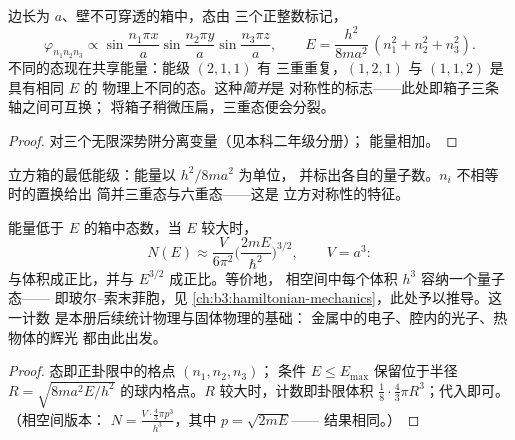 \begin{proposition}[立方箱及其简并]\label{prop:b3:schrodinger-three-dimensions:box}
边长为 $a$、壁不可穿透的箱中，态由
三个正整数标记，
\[
\varphi_{n_1n_2n_3} \propto
\sin\frac{n_1\pi x}{a}\sin\frac{n_2\pi y}{a}\sin\frac{n_3\pi z}{a} ,
\qquad
E = \frac{h^2}{8ma^2}\,(n_1^2 + n_2^2 + n_3^2) .
\]
不同的态现在共享能量：能级 $(2,1,1)$ 有
三重重复，$(1,2,1)$ 与 $(1,1,2)$ 是具有相同 $E$ 的
物理上不同的态。这种\emph{简并}是
对称性的标志——此处即箱子三条轴之间可互换；
将箱子稍微压扁，三重态便会分裂。
\end{proposition}

\begin{proof}
对三个无限深势阱分离变量（见本科二年级分册）；
能量相加。
\end{proof}

\begin{omfigure}

{\small 立方箱的最低能级：能量以 $h^2/8ma^2$ 为单位，
并标出各自的量子数。$n_i$ 不相等时的置换给出
简并三重态与六重态——这是
立方对称性的特征。}
\end{omfigure}

\begin{proposition}[态的计数]\label{prop:b3:schrodinger-three-dimensions:counting}
能量低于 $E$ 的箱中态数，当 $E$ 较大时，
\[
N(E) \approx \frac{V}{6\pi^2}\Big(\frac{2mE}{\hbar^2}\Big)^{3/2} ,
\qquad V = a^3 :
\]
与体积成正比，并与 $E^{3/2}$ 成正比。等价地，
相空间中每个体积 $h^3$ 容纳一个量子态——
即玻尔–索末菲胞，见
\cref{ch:b3:hamiltonian-mechanics}，此处予以推导。这一计数
是本册后续统计物理与固体物理的基础：
金属中的电子、腔内的光子、热物体的辉光
都由此出发。
\end{proposition}

\begin{proof}
态即正卦限中的格点 $(n_1, n_2, n_3)$；
条件 $E \le E_{\max}$ 保留位于半径 $R =
\sqrt{8ma^2E/h^2}$ 的球内格点。$R$ 较大时，计数即卦限体积
$\tfrac18\cdot\tfrac43\pi R^3$；代入即可。（相空间版本：
$N = \tfrac{V\cdot\frac43\pi p^3}{h^3}$，其中 $p = \sqrt{2mE}$——
结果相同。）
\end{proof}

